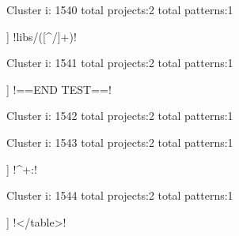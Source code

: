 Cluster i: 1540
total projects:2
total patterns:1
\begin{multicols}{1}
\begin{description}[noitemsep,topsep=0pt]
\item [[2] ] \cverb!libs/([^/]+)!
\end{description}
\end{multicols}







Cluster i: 1541
total projects:2
total patterns:1
\begin{multicols}{1}
\begin{description}[noitemsep,topsep=0pt]
\item [[2] ] \cverb!==END TEST==!
\end{description}
\end{multicols}







Cluster i: 1542
total projects:2
total patterns:1
\begin{multicols}{1}
\end{multicols}







Cluster i: 1543
total projects:2
total patterns:1
\begin{multicols}{1}
\begin{description}[noitemsep,topsep=0pt]
\item [[2] ] \cverb!^\w+:\/\/!
\end{description}
\end{multicols}







Cluster i: 1544
total projects:2
total patterns:1
\begin{multicols}{1}
\begin{description}[noitemsep,topsep=0pt]
\item [[2] ] \cverb!\s*</table>!
\end{description}
\end{multicols}







